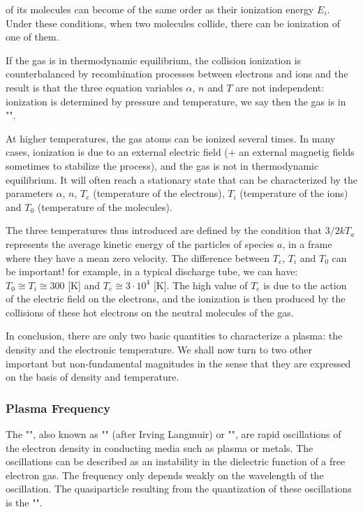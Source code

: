 	of its molecules can become of the same order as their ionization energy $E_i$. Under these conditions, when two molecules collide, there can be ionization of one of them.
	
	If the gas is in thermodynamic equilibrium, the collision ionization is counterbalanced by recombination processes between electrons and ions and the result is that the three equation variables $\alpha$, $n$ and $T$ are not independent: ionization is determined by pressure and temperature, we say then the gas is in "".

	At higher temperatures, the gas atoms can be ionized several times. In many cases, ionization is due to an external electric field (+ an external magnetig fields sometimes to stabilize the process), and the gas is not in thermodynamic equilibrium. It will often reach a stationary state that can be characterized by the parameters $\alpha$, $n$, $T_e$ (temperature of the electrons), $T_i$ (temperature of the ions) and $T_0$ (temperature of the molecules).
	
	The three temperatures thus introduced are defined by the condition that $3/2 kT_a$ represents the average kinetic energy of the particles of species $a$, in a frame where they have a mean zero velocity. The difference between $T_e$, $T_i$ and $T_0$ can be important! for example, in a typical discharge tube, we can have: $T_0\cong T_i \cong 300$ [K] and $T_e\cong 3\cdot 10^4$ [K]. The high value of $T_e$ is due to the action of the electric field on the electrons, and the ionization is then produced by the collisions of these hot electrons on the neutral molecules of the gas.

	In conclusion, there are only two basic quantities to characterize a plasma: the density and the electronic temperature. We shall now turn to two other important but non-fundamental magnitudes in the sense that they are expressed on the basis of density and temperature.

	\subsubsection{Plasma Frequency}
	The "", also known as ""  (after Irving Langmuir) or "", are rapid oscillations of the electron density in conducting media such as plasma or metals. The oscillations can be described as an instability in the dielectric function of a free electron gas. The frequency only depends weakly on the wavelength of the oscillation. The quasiparticle resulting from the quantization of these oscillations is the "".

